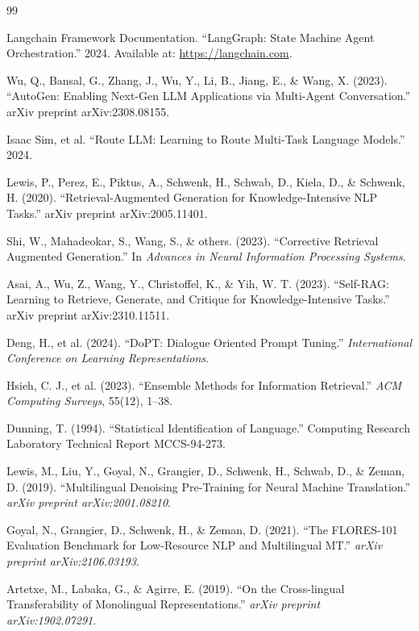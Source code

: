 \documentclass[11pt,a4paper]{article}
\begin{document}
\begin{thebibliography}{99}

Langchain Framework Documentation. ``LangGraph: State Machine Agent Orchestration.'' 2024. Available at: \url{https://langchain.com}.

Wu, Q., Bansal, G., Zhang, J., Wu, Y., Li, B., Jiang, E., \& Wang, X. (2023). ``AutoGen: Enabling Next-Gen LLM Applications via Multi-Agent Conversation.'' arXiv preprint arXiv:2308.08155.

Isaac Sim, et al. ``Route LLM: Learning to Route Multi-Task Language Models.'' 2024.

Lewis, P., Perez, E., Piktus, A., Schwenk, H., Schwab, D., Kiela, D., \& Schwenk, H. (2020). ``Retrieval-Augmented Generation for Knowledge-Intensive NLP Tasks.'' arXiv preprint arXiv:2005.11401.

Shi, W., Mahadeokar, S., Wang, S., \& others. (2023). ``Corrective Retrieval Augmented Generation.'' In \textit{Advances in Neural Information Processing Systems}.

Asai, A., Wu, Z., Wang, Y., Christoffel, K., \& Yih, W. T. (2023). ``Self-RAG: Learning to Retrieve, Generate, and Critique for Knowledge-Intensive Tasks.'' arXiv preprint arXiv:2310.11511.

Deng, H., et al. (2024). ``DoPT: Dialogue Oriented Prompt Tuning.'' \textit{International Conference on Learning Representations}.

Hsieh, C. J., et al. (2023). ``Ensemble Methods for Information Retrieval.'' \textit{ACM Computing Surveys}, 55(12), 1--38.

Dunning, T. (1994). ``Statistical Identification of Language.'' Computing Research Laboratory Technical Report MCCS-94-273.

Lewis, M., Liu, Y., Goyal, N., Grangier, D., Schwenk, H., Schwab, D., \& Zeman, D. (2019). ``Multilingual Denoising Pre-Training for Neural Machine Translation.'' \textit{arXiv preprint arXiv:2001.08210}.

Goyal, N., Grangier, D., Schwenk, H., \& Zeman, D. (2021). ``The FLORES-101 Evaluation Benchmark for Low-Resource NLP and Multilingual MT.'' \textit{arXiv preprint arXiv:2106.03193}.

Artetxe, M., Labaka, G., \& Agirre, E. (2019). ``On the Cross-lingual Transferability of Monolingual Representations.'' \textit{arXiv preprint arXiv:1902.07291}.


\end{thebibliography}
\end{document}
